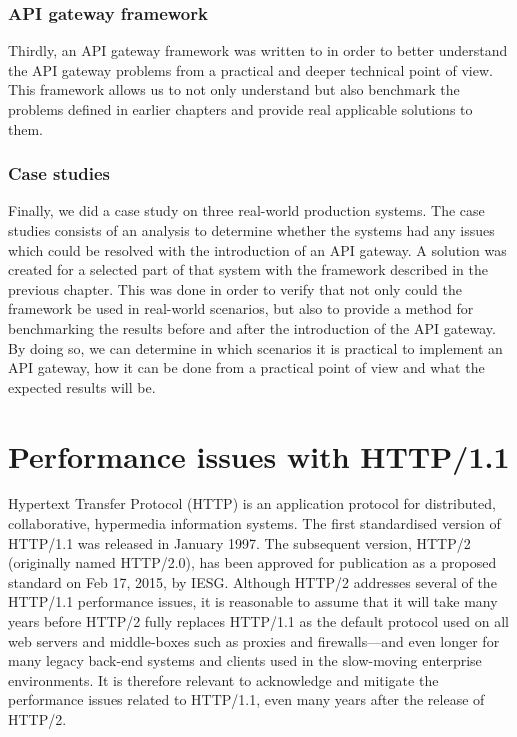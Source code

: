 \documentclass{cslthse-msc}
\begin{document}
\subsection{API gateway framework}
Thirdly, an API gateway framework was written to in order to better understand the API gateway problems from a practical and deeper technical point of view. This framework allows us to not only understand but also benchmark the problems defined in earlier chapters and provide real applicable solutions to them.

\subsection{Case studies}
Finally, we did a case study on three real-world production systems. The case studies consists of an analysis to determine whether the systems had any issues which could be resolved with the introduction of an API gateway. A solution was created for a selected part of that system with the framework described in the previous chapter. This was done in order to verify that not only could the framework be used in real-world scenarios, but also to provide a method for benchmarking the results before and after the introduction of the API gateway. By doing so, we can determine in which scenarios it is practical to implement an API gateway, how it can be done from a practical point of view and what the expected results will be.

\chapter{Performance issues with HTTP/1.1}
Hypertext Transfer Protocol (HTTP) is an application protocol for distributed, collaborative, hypermedia information systems\cite{http-info}. The first standardised version of HTTP/1.1 was released in January 1997\cite{rfc2068}. The subsequent version, HTTP/2 (originally named HTTP/2.0), has been approved for publication as a proposed standard on Feb 17, 2015, by IESG. Although HTTP/2 addresses several of the HTTP/1.1 performance issues, it is reasonable to assume that it will take many years before HTTP/2 fully replaces HTTP/1.1 as the default protocol used on all web servers and middle-boxes such as proxies and firewalls---and even longer for many legacy back-end systems and clients used in the slow-moving enterprise environments. It is therefore relevant to acknowledge and mitigate the performance issues related to HTTP/1.1, even many years after the release of HTTP/2.
\end{document}
